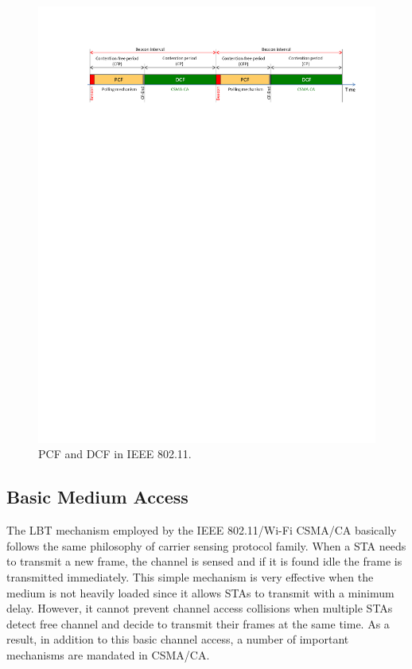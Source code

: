 \begin{figure}[!t]
	\centering
	\includegraphics[width=1.0\columnwidth]{figures2/802-11-PCF-DCF}
	\caption{PCF and DCF in IEEE 802.11.}
	\label{figs:802-11-PCF-DCF}
\end{figure}

\subsection{Basic Medium Access}
\label{basic-medium-access}

The LBT mechanism employed by the IEEE 802.11/Wi-Fi CSMA/CA basically follows the same philosophy of carrier sensing protocol family. When a STA needs to transmit a new frame, the channel is sensed and if it is found idle the frame is transmitted immediately. This simple mechanism is very effective when the medium is not heavily loaded since it allows STAs to transmit with a minimum delay. However, it cannot prevent channel access collisions when multiple STAs detect free channel and decide to transmit their frames at the same time. As a result, in addition to this basic channel access, a number of important mechanisms are mandated in CSMA/CA.

